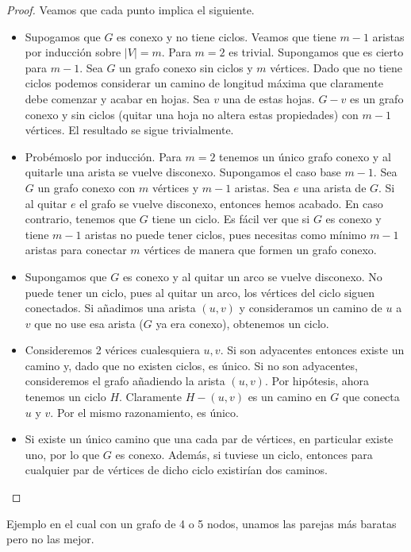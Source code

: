 \documentclass[twoside]{article}
\begin{document}
\begin{solucion}
\begin{proof}Veamos que cada punto implica el siguiente.
\begin{itemize}
\item Supogamos que $G$ es conexo y no tiene ciclos. Veamos que tiene $m-1$ aristas por inducción sobre $|V|=m$. Para $m=2$ es trivial. Supongamos que es cierto para $m-1$. Sea $G$ un grafo conexo sin ciclos y $m$ vértices. Dado que no tiene ciclos podemos considerar un camino de longitud máxima que claramente debe comenzar y acabar en hojas. Sea $v$ una de estas hojas. $G-v$ es un grafo conexo y sin ciclos (quitar una hoja no altera estas propiedades) con $m-1$ vértices. El resultado se sigue trivialmente.
\item Probémoslo por inducción. Para $m=2$ tenemos un único grafo conexo y al quitarle una arista se vuelve disconexo. Supongamos el caso base $m-1$. Sea $G$ un grafo conexo con $m$ vértices y $m-1$ aristas. Sea $e$ una arista de $G$. Si al quitar $e$ el grafo se vuelve disconexo, entonces hemos acabado. En caso contrario, tenemos que $G$ tiene un ciclo. Es fácil ver que si $G$ es conexo y tiene $m-1$ aristas no puede tener ciclos, pues necesitas como mínimo $m-1$ aristas para conectar $m$ vértices de manera que formen un grafo conexo.
\item Supongamos que $G$ es conexo y al quitar un arco se vuelve disconexo. No puede tener un ciclo, pues al quitar un arco, los vértices del ciclo siguen conectados. Si añadimos una arista $(u,v)$ y consideramos un camino de $u$ a $v$ que no use esa arista ($G$ ya era conexo), obtenemos un ciclo.
\item Consideremos 2 vérices cualesquiera $u,v$. Si son adyacentes entonces existe un camino y, dado que no existen ciclos, es único. Si no son adyacentes, consideremos el grafo añadiendo la arista $(u,v)$. Por hipótesis, ahora tenemos un ciclo $H$. Claramente $H-(u,v)$ es un camino en $G$ que conecta $u$ y $v$. Por el mismo razonamiento, es único.
\item Si existe un único camino que una cada par de vértices, en particular existe uno, por lo que $G$ es conexo. Además, si tuviese un ciclo, entonces para cualquier par de vértices de dicho ciclo existirían dos caminos. 
\end{itemize}
\end{proof}
\end{solucion}
\newpage

\begin{ejercicio}{2.6}
Ejemplo en el cual con un grafo de 4 o 5 nodos, unamos las parejas más baratas pero no las mejor.
\end{ejercicio}
\newpage
\end{document}

